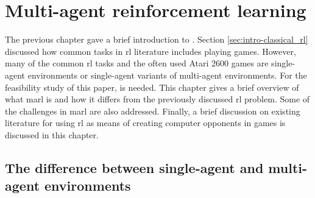 \chapter{Multi-agent reinforcement learning}
\label{ch:marl}

The previous chapter gave a brief introduction to .
Section \ref{sec:intro-classical_rl} discussed how common tasks in \gls{rl} literature includes playing games.
However, many of the common \gls{rl} tasks and the often used Atari 2600 games are single-agent environments or single-agent variants of multi-agent environments.
For the feasibility study of this paper,  is needed.
This chapter gives a brief overview of what \gls{marl} is and how it differs from the previously discussed \gls{rl} problem.
Some of the challenges in \gls{marl} are also addressed.
Finally, a brief discussion on existing literature for using \gls{rl} as means of creating computer opponents in games is discussed in this chapter.


\section{The difference between single-agent and multi-agent environments}
\label{sec:marl-vs_single}


